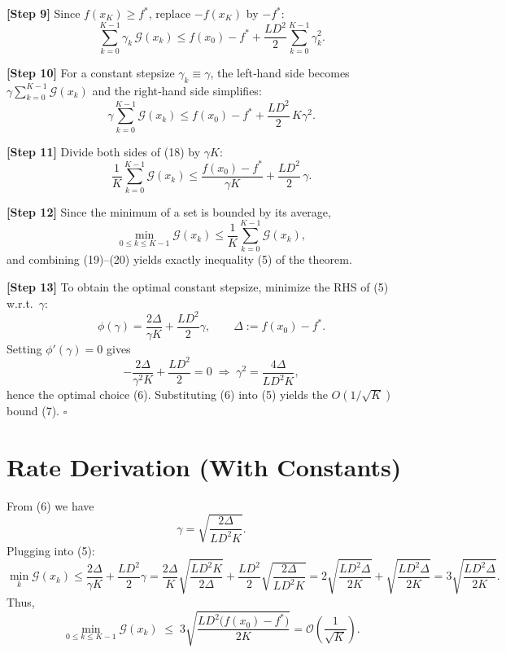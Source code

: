 \documentclass{article}
\newcommand{\gap}{\mathcal{G}}
\begin{document}
\noindent\textbf{[Step 9]} Since $f(x_{K})\ge f^{*}$, replace $-f(x_{K})$ by $-f^{*}$:
\[
\sum_{k=0}^{K-1}\gamma_{k}\,\gap(x_{k})
\le f(x_{0})-f^{*} + \frac{L D^{2}}{2}\sum_{k=0}^{K-1}\gamma_{k}^{2}.
\tag{17}
\]

\noindent\textbf{[Step 10]} For a constant stepsize $\gamma_{k}\equiv\gamma$, the left‑hand side becomes $\gamma\sum_{k=0}^{K-1}\gap(x_{k})$ and the right‑hand side simplifies:
\[
\gamma\sum_{k=0}^{K-1}\gap(x_{k})
\le f(x_{0})-f^{*} + \frac{L D^{2}}{2}\,K\gamma^{2}.
\tag{18}
\]

\noindent\textbf{[Step 11]} Divide both sides of (18) by $\gamma K$:
\[
\frac{1}{K}\sum_{k=0}^{K-1}\gap(x_{k})
\le \frac{f(x_{0})-f^{*}}{\gamma K}
   + \frac{L D^{2}}{2}\,\gamma .
\tag{19}
\]

\noindent\textbf{[Step 12]} Since the minimum of a set is bounded by its average,
\[
\min_{0\le k\le K-1}\gap(x_{k})
\le \frac{1}{K}\sum_{k=0}^{K-1}\gap(x_{k}),
\tag{20}
\]
and combining (19)–(20) yields exactly inequality (5) of the theorem.

\noindent\textbf{[Step 13]} To obtain the optimal constant stepsize, minimize the RHS of (5) w.r.t.\ $\gamma$:
\[
\phi(\gamma)=\frac{2\Delta}{\gamma K}+\frac{L D^{2}}{2}\gamma,
\qquad\Delta:=f(x_{0})-f^{*}.
\]
Setting $\phi'(\gamma)=0$ gives
\[
-\frac{2\Delta}{\gamma^{2}K}+\frac{L D^{2}}{2}=0
\;\Longrightarrow\;
\gamma^{2}= \frac{4\Delta}{L D^{2}K},
\]
hence the optimal choice (6). Substituting (6) into (5) yields the $O(1/\sqrt{K})$ bound (7). \hfill $\square$

\section*{Rate Derivation (With Constants)}
From (6) we have
\[
\gamma = \sqrt{\frac{2\Delta}{L D^{2}K}} .
\]
Plugging into (5):
\[
\min_{k}\gap(x_{k})
\le \frac{2\Delta}{\gamma K} + \frac{L D^{2}}{2}\gamma
= \frac{2\Delta}{K}\sqrt{\frac{L D^{2}K}{2\Delta}} + \frac{L D^{2}}{2}\sqrt{\frac{2\Delta}{L D^{2}K}}
= 2\sqrt{\frac{L D^{2}\Delta}{2K}} + \sqrt{\frac{L D^{2}\Delta}{2K}}
= 3\sqrt{\frac{L D^{2}\Delta}{2K}} .
\]
Thus,
\[
\boxed{\displaystyle
\min_{0\le k\le K-1}\gap(x_{k})\;\le\;3\sqrt{\frac{L D^{2}\bigl(f(x_{0})-f^{*}\bigr)}{2K}}
= \mathcal{O}\!\left(\frac{1}{\sqrt{K}}\right)} .
\]
\end{document}
